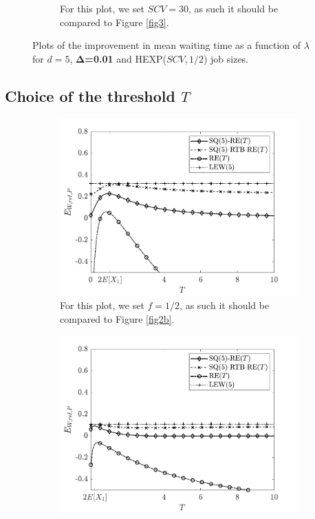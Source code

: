 \documentclass[12pt]{report}
\begin{document}
\begin{figure}[t]
\begin{center}
\begin{subfigure}{.43\textwidth}
\caption{For this plot, we set $SCV=30$, as such it should be compared to Figure \ref{fig3}.}
\label{fig11b}
\end{subfigure}
\caption{Plots of the improvement in mean waiting time as a function of $\lambda$ for $d=5$, $\boldsymbol \Delta$\textbf{=0.01} and HEXP($SCV, 1/2$) job sizes.}
\label{fig11}
\end{center}
\end{figure}


\subsection{Choice of the threshold $T$} \label{sec:num_threshold}
\begin{figure}[t]
\begin{center}
\begin{subfigure}{0.43\textwidth}
\centering
\captionsetup{width=.8\linewidth}
\includegraphics[width=1\linewidth]{figures/Chapter7/fig12a.pdf}
\caption{For this plot, we set $f=1/2$, as such it should be compared to Figure \ref{fig2b}.}
\label{fig12a}
\end{subfigure}
\begin{subfigure}{.43\textwidth}
\centering
\captionsetup{width=.8\linewidth}
\includegraphics[width=1\linewidth]{figures/Chapter7/fig12b.pdf}

\end{subfigure}
\end{center}
\end{figure}
\end{document}
